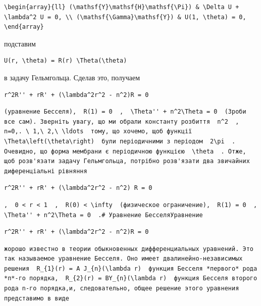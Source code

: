 \documentclass[
  ukrainian,
]{article}
\begin{document}
\begin{verbatim}
\begin{array}{ll} (\mathsf{Y}\mathsf{H}\mathsf{\Pi}) & \Delta U + \lambda^2 U = 0, \\ (\mathsf{\Gamma}\mathsf{Y}) & U(1, \theta) = 0, \end{array}
\end{verbatim}

подставим

\begin{verbatim}
U(r, \theta) = R(r) \Theta(\theta)
\end{verbatim}

в задачу Гельмгольца. Сделав это, получаем

\begin{verbatim}
r^2R'' + rR' + (\lambda^2r^2 - n^2)R = 0
\end{verbatim}

\begin{verbatim}
(уравнение Бесселя),  R(1) = 0  ,  \Theta'' + n^2\Theta = 0  (Зроби все сам). Зверніть увагу, що ми обрали константу розбиття  n^2  ,  n=0,. \ 1,\ 2,\ \ldots  тому, що хочемо, щоб функції  \Theta\left(\theta\right)  були періодичними з періодом  2\pi  . Очевидно, що форма мембрани є періодичною функцією  \theta  . Отже, щоб розв'язати задачу Гельмгольца, потрібно розв'язати два звичайних диференціальні рівняння
\end{verbatim}

\begin{verbatim}
r^2R'' + rR' + (\lambda^2r^2 - n^2) R = 0
\end{verbatim}

\begin{verbatim}
,  0 < r < 1  ,  R(0) < \infty  (физическое ограничение),  R(1) = 0  ,  \Theta'' + n^2\Theta = 0  .# Уравнение БесселяУравнение
\end{verbatim}

\begin{verbatim}
r^2R'' + rR' + (\lambda^2r^2 - n^2)R = 0
\end{verbatim}

\begin{verbatim}
жорошо известно в теории обыкновенных дифференциальных уравнений. Это так называемое уравнение Бесселя. Оно имеет двалинейно-независимых решения  R_{1}(r) = A J_{n}(\lambda r)  функция Бесселя *первого* рода *п*-го порядка,  R_{2}(r) = BY_{n}(\lambda r)  функция Бесселя второго рода n-го порядка,и, следовательно, общее решение этого уравнения представимо в виде
\end{verbatim}
\end{document}
